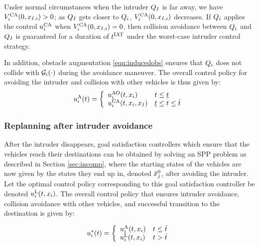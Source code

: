 Under normal circumstances when the intruder $Q_{I}$ is far away, we have $V^{\text{CA}}_{i}(0, x_{I, i}) > 0$; as $Q_{I}$ gets closer to $Q_i$, $V^{\text{CA}}_{i}(0, x_{I, i})$ decreases. If $Q_i$ applies the control ${u^{\text{CA}}_{i}}$ when $V^{\text{CA}}_{i}(0, x_{I, i}) = 0$, then collision avoidance between $Q_i$ and $Q_{I}$ is guaranteed for a duration of $t^\text{IAT}$ under the worst-case intruder control strategy.

In addition, obstacle augmentation \eqref{eqn:inducedobs} ensures that $Q_i$ does not collide with $\mathcal{G}_i(\cdot)$ during the avoidance maneuver. %
The overall control policy for avoiding the intruder and collision with other vehicles is thus given by:
\begin{equation*}
{u^{\text{A}}_{i}}(t) = 
\left \{ 
\begin{array}{ll}
{u^{\text{AO}}_{i}}(t, x_i) & t \leq \underline{t}\\
{u^{\text{CA}}_{i}}(t, x_i, x_I) & \underline{t}\leq t \leq \bar{t}
\end{array}
\right.
\end{equation*}

\subsubsection{Replanning after intruder avoidance\label{sec:re-plan_method1}} 
After the intruder disappears, goal satisfaction controllers which ensure that the vehicles reach their destinations can be obtained by solving an SPP problem as described in Section \ref{sec:incomp}, where the starting states of the vehicles are now given by the states they end up in, denoted $\tilde{x}_j^0$, after avoiding the intruder. Let the optimal control policy corresponding to this goal satisfaction controller be denoted ${u^{\text{L}}_{i}}(t, x_i)$. The overall control policy that ensures intruder avoidance, collision avoidance with other vehicles, and successful transition to the destination is given by:

\begin{equation*}
u_i^*(t) = 
\left \{ 
\begin{array}{ll}
{u^{\text{A}}_{i}}(t, x_i) & t \leq \bar{t}\\
{u^{\text{L}}_{i}}(t, x_i) & t > \bar{t}
\end{array}
\right.
\end{equation*}

